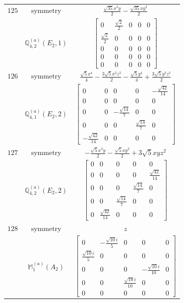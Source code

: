 \documentclass[fleqn,8pt,landscape]{jsarticle}
\begin{document}
\begin{longtable}{ccc}
$ 125 $ & $ \text{symmetry} $ & $ \frac{\sqrt{35} x^{3} y}{2} - \frac{\sqrt{35} x y^{3}}{2} $ \\
$  $ & $ \mathbb{Q}_{4,2}^{(a)}(E_{2},1) $ & $ \begin{bmatrix} 0 & \frac{\sqrt{2}}{2} & 0 & 0 & 0 \\ \frac{\sqrt{2}}{2} & 0 & 0 & 0 & 0 \\ 0 & 0 & 0 & 0 & 0 \\ 0 & 0 & 0 & 0 & 0 \\ 0 & 0 & 0 & 0 & 0 \end{bmatrix} $ \\ \hline
$ 126 $ & $ \text{symmetry} $ & $ \frac{\sqrt{5} x^{4}}{4} - \frac{3 \sqrt{5} x^{2} z^{2}}{2} - \frac{\sqrt{5} y^{4}}{4} + \frac{3 \sqrt{5} y^{2} z^{2}}{2} $ \\
$  $ & $ \mathbb{Q}_{4,1}^{(a)}(E_{2},2) $ & $ \begin{bmatrix} 0 & 0 & 0 & 0 & - \frac{\sqrt{42}}{14} \\ 0 & 0 & 0 & 0 & 0 \\ 0 & 0 & - \frac{\sqrt{14}}{7} & 0 & 0 \\ 0 & 0 & 0 & \frac{\sqrt{14}}{7} & 0 \\ - \frac{\sqrt{42}}{14} & 0 & 0 & 0 & 0 \end{bmatrix} $ \\ \hline
$ 127 $ & $ \text{symmetry} $ & $ - \frac{\sqrt{5} x^{3} y}{2} - \frac{\sqrt{5} x y^{3}}{2} + 3 \sqrt{5} x y z^{2} $ \\
$  $ & $ \mathbb{Q}_{4,2}^{(a)}(E_{2},2) $ & $ \begin{bmatrix} 0 & 0 & 0 & 0 & 0 \\ 0 & 0 & 0 & 0 & \frac{\sqrt{42}}{14} \\ 0 & 0 & 0 & \frac{\sqrt{14}}{7} & 0 \\ 0 & 0 & \frac{\sqrt{14}}{7} & 0 & 0 \\ 0 & \frac{\sqrt{42}}{14} & 0 & 0 & 0 \end{bmatrix} $ \\ \hline
$ 128 $ & $ \text{symmetry} $ & $ z $ \\
$  $ & $ \mathbb{M}_{1}^{(a)}(A_{2}) $ & $ \begin{bmatrix} 0 & - \frac{\sqrt{10} i}{5} & 0 & 0 & 0 \\ \frac{\sqrt{10} i}{5} & 0 & 0 & 0 & 0 \\ 0 & 0 & 0 & - \frac{\sqrt{10} i}{10} & 0 \\ 0 & 0 & \frac{\sqrt{10} i}{10} & 0 & 0 \\ 0 & 0 & 0 & 0 & 0 \end{bmatrix} $ \\ \hline

\end{longtable}
\end{document}

